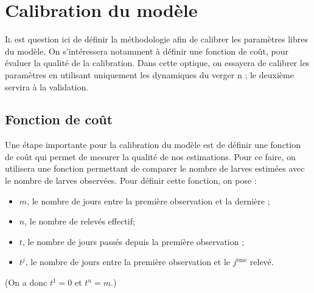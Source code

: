 \chapter{Calibration du modèle} 

\lettrine{I}{l} est question ici de définir la méthodologie afin de calibrer les paramètres libres du modèle.
On s'intéressera notamment à définir une fonction de coût, pour évaluer la qualité de la calibration.
Dans cette optique, on essayera de calibrer les paramètres en utilisant uniquement les dynamiques du verger n ; le deuxième servira à la validation.



\section{Fonction de coût}

Une étape importante pour la calibration du modèle est de définir une fonction de coût qui permet de mesurer la qualité de nos estimations.
Pour ce faire, on utilisera une fonction permettant de comparer le nombre de larves estimées avec le nombre de larves observées. 
Pour définir cette fonction, on pose :
\begin{itemize}
 \item $m$, le nombre de jours entre la première observation et la dernière ;
 \item $n$, le nombre de relevés effectif;
 \item $t$, le nombre de jours passés depuis la première observation ;
 \item $t^j$, le nombre de jours entre la première observation et le $j^{\text{ème}}$ relevé.
\end{itemize}
(On a donc $t^1 = 0$ et $t^n = m$.)

